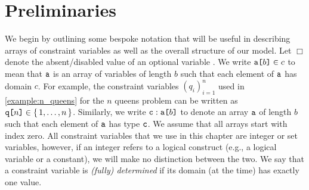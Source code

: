 \section{Preliminaries}


We begin by outlining some bespoke notation that will be useful in describing
arrays of constraint variables as well as the overall structure of our model.
Let $\Box$ denote the absent/disabled value of an optional variable
\citep{DBLP:conf/cpaior/MearsSSTMW14}. We write $\arrayd{a}{b}{c}$ to mean that
$\variable{a}$ is an array of variables of length $b$ such that each element of
$\variable{a}$ has domain $c$. For example, the constraint variables
${(q_i)}_{i=1}^n$ used in \cref{example:n_queens} for the $n$ queens problem can
be written as $\arrayd{q}{n}{\{\, 1, \dots, n \,\}}$. Similarly, we write
$\arrayt{a}{b}{c}$ to denote an array $\variable{a}$ of length $b$ such that
each element of $\variable{a}$ has type $\variable{c}$. We assume that all
arrays start with index zero. All constraint variables that we use in this
chapter are integer or set variables, however, if an integer refers to a logical
construct (e.g., a logical variable or a constant), we will make no distinction
between the two. We say that a constraint variable is \emph{(fully) determined}
if its domain (at the time) has exactly one value.

